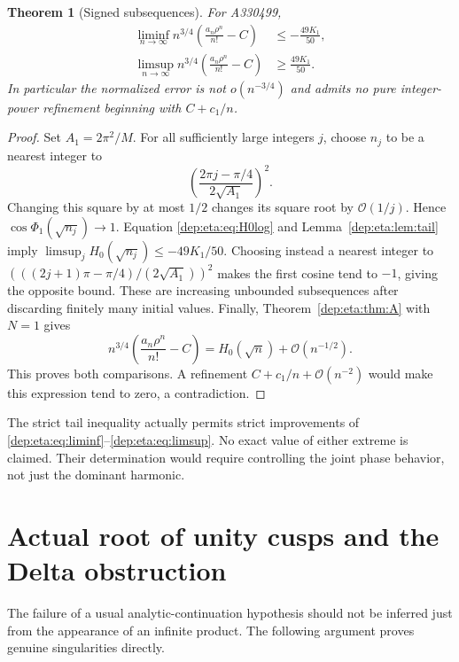 \documentclass[11pt]{article}
\newtheorem{theorem}{Theorem}[section]
\theoremstyle{definition}\newtheorem{definition}[theorem]{Definition}
\theoremstyle{remark}\newtheorem{remark}[theorem]{Remark}
\newcommand{\OO}{\mathcal O}
\begin{document}
\begin{theorem}[Signed subsequences]\label{dep:eta:thm:sign}
For A330499,
\begin{align}
 \liminf_{n\to\infty}n^{3/4}
       \left(\frac{a_n\rho^n}{n!}-C\right)&\le-\frac{49K_1}{50},\label{dep:eta:eq:liminf}\\
 \limsup_{n\to\infty}n^{3/4}
       \left(\frac{a_n\rho^n}{n!}-C\right)&\ge\frac{49K_1}{50}.
 \label{dep:eta:eq:limsup}
\end{align}
In particular the normalized error is not $o(n^{-3/4})$ and admits
no pure integer-power refinement beginning with $C+c_1/n$.
\end{theorem}
\begin{proof}
Set $A_1=2\pi^2/M$. For all sufficiently large integers $j$, choose
$n_j$ to be a nearest integer to
\[
 \left(\frac{2\pi j-\pi/4}{2\sqrt{A_1}}\right)^2.
\]
Changing this square by at most $1/2$ changes its square root by
$\OO(1/j)$. Hence $\cos\Phi_1(\sqrt{n_j})\to1$. Equation
\eqref{dep:eta:eq:H0log} and Lemma~\ref{dep:eta:lem:tail} imply
$\limsup_j H_0(\sqrt{n_j})\le-49K_1/50$.
Choosing instead a nearest integer to
$(((2j+1)\pi-\pi/4)/(2\sqrt{A_1}))^2$ makes the first cosine tend
to $-1$, giving the opposite bound. These are increasing unbounded
subsequences after discarding finitely many initial values.
Finally, Theorem~\ref{dep:eta:thm:A} with $N=1$ gives
\[
 n^{3/4}\left(\frac{a_n\rho^n}{n!}-C\right)
          =H_0(\sqrt n)+\OO(n^{-1/2}).
\]
This proves both comparisons. A refinement $C+c_1/n+\OO(n^{-2})$
would make this expression tend to zero, a contradiction.
\end{proof}
The strict tail inequality actually permits strict improvements of
\eqref{dep:eta:eq:liminf}--\eqref{dep:eta:eq:limsup}. No exact value of either extreme
is claimed. Their determination would require controlling the joint
phase behavior, not just the dominant harmonic.

\section{Actual root of unity cusps and the Delta obstruction}\label{dep:eta:sec:cusps}
The failure of a usual analytic-continuation hypothesis should not be
inferred just from the appearance of an infinite product. The
following argument proves genuine singularities directly.
\end{document}
